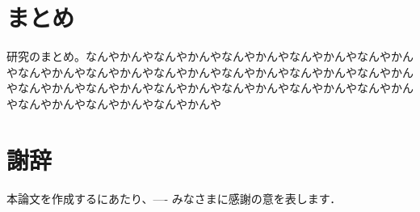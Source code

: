 \documentclass[11pt,a4j]{jreport}
\begin{document}
\chapter{まとめ}
研究のまとめ。なんやかんやなんやかんやなんやかんやなんやかんやなんやかんやなんやかんやなんやかんやなんやかんやなんやかんやなんやかんやなんやかんやなんやかんやなんやかんやなんやかんやなんやかんやなんやかんやなんやかんやなんやかんやなんやかんやなんやかんや

\chapter*{謝辞} %
本論文を作成するにあたり、---- みなさまに感謝の意を表します．


\renewcommand{\bibname}{参考文献} %
\cite{keg}
\cite{ck3}
\end{document}
